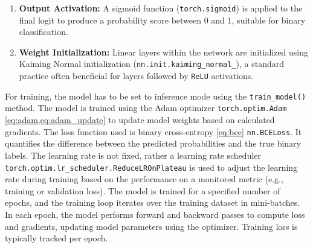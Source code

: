 \begin{enumerate}
  \item \textbf{Output Activation:} A sigmoid function (\texttt{torch.sigmoid}) is applied to the final logit to produce a probability score between 0 and 1, suitable for binary classification.

  \item \textbf{Weight Initialization:} Linear layers within the network are initialized using Kaiming Normal initialization (\texttt{nn.init.kaiming\_normal\_}), a standard practice often beneficial for layers followed by \texttt{ReLU} activations.
\end{enumerate}

For training, the model has to be set to inference mode using the \texttt{train\_model()} method. The model is trained using the Adam optimizer \texttt{torch.optim.Adam} \autoref{eq:adam,eq:adam_update} \autocite{kingma2014adam} to update model weights based on calculated gradients. The loss function used is binary cross-entropy \autoref{eq:bce} \texttt{nn.BCELoss}. It quantifies the difference between the predicted probabilities and the true binary labels. The learning rate is not fixed, rather a learning rate scheduler \texttt{torch.optim.lr\_scheduler.ReduceLROnPlateau} is used to adjust the learning rate during training based on the performance on a monitored metric (e.g., training or validation loss). The model is trained for a specified number of epochs, and the training loop iterates over the training dataset in mini-batches. In each epoch, the model performs forward and backward passes to compute loss and gradients, updating model parameters using the optimizer. Training loss is typically tracked per epoch.

